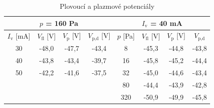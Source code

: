 \documentclass[a4paper,12pt]{article}
\begin{document}
\begin{center}
	\begin{table}[h!]
		\centering
		\caption{Plovoucí a plazmové potenciály}
		\label{tab1}
		\begin{tabular}{|c|c|c|c|c|c|c|c|} \hline
			\multicolumn{4}{|c|}{$p$ = 160 \si{\pascal}}& 
			\multicolumn{4}{c|}{$I_\text{v}$ = 40 \si{\milli\ampere} }  \\ 
			\hline
			$I_\text{v}$ [\si{\milli\ampere}] &  $V_\text{fl}$ [V] & 
			$V_\text{p}$ [V] & $V_\text{p,d}$ [V] & $p$ [\si{\pascal}] &  
			$V_\text{fl}$ [V] & $V_\text{p}$ [V] & $V_\text{p,d}$ \\ \hline
			30 & -48,0 & -47,7 & -43,4 & 8 & -45,3 & -44,8 & -43,8 \\ \hline
			40 & -43,8 & -43,4 & -39,7 & 16 & -45,8 & -45,2 & -44,4 \\ \hline
			50 & -42,2 & -41,6 & -37,5 & 32 & -45,0 & -44,6 & -43,4 \\ \hline
			& & & & 80 & -44,4 & -43,9 & -42,8 \\ \hline
			& & & & 320 & -50,9 & -49,9 & -45,8 \\ \hline
			
		\end{tabular}
	\end{table}
\end{center}
\end{document}
